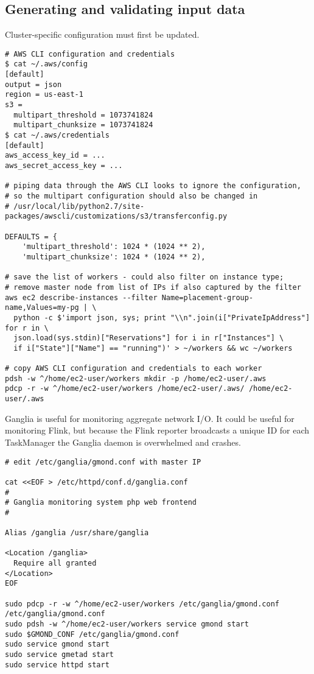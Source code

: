 \documentclass{article}
\begin{document}
\subsection{Generating and validating input data}

Cluster-specific configuration must first be updated.

\begin{adjustwidth}{-1.5in}{-1.5in}
\begin{verbatim}
# AWS CLI configuration and credentials
$ cat ~/.aws/config
[default]
output = json
region = us-east-1
s3 =
  multipart_threshold = 1073741824
  multipart_chunksize = 1073741824
$ cat ~/.aws/credentials 
[default]
aws_access_key_id = ...
aws_secret_access_key = ...

# piping data through the AWS CLI looks to ignore the configuration,
# so the multipart configuration should also be changed in
# /usr/local/lib/python2.7/site-packages/awscli/customizations/s3/transferconfig.py

DEFAULTS = {
    'multipart_threshold': 1024 * (1024 ** 2),
    'multipart_chunksize': 1024 * (1024 ** 2),

# save the list of workers - could also filter on instance type;
# remove master node from list of IPs if also captured by the filter
aws ec2 describe-instances --filter Name=placement-group-name,Values=my-pg | \
  python -c $'import json, sys; print "\\n".join(i["PrivateIpAddress"] for r in \
  json.load(sys.stdin)["Reservations"] for i in r["Instances"] \
  if i["State"]["Name"] == "running")' > ~/workers && wc ~/workers

# copy AWS CLI configuration and credentials to each worker
pdsh -w ^/home/ec2-user/workers mkdir -p /home/ec2-user/.aws
pdcp -r -w ^/home/ec2-user/workers /home/ec2-user/.aws/ /home/ec2-user/.aws
\end{verbatim}
\end{adjustwidth}

Ganglia is useful for monitoring aggregate network I/O. It could be useful for monitoring Flink, but because the Flink reporter broadcasts a unique ID for each TaskManager the Ganglia daemon is overwhelmed and crashes.

\begin{adjustwidth}{-1.5in}{-1.5in}
\begin{verbatim}
# edit /etc/ganglia/gmond.conf with master IP

cat <<EOF > /etc/httpd/conf.d/ganglia.conf
#
# Ganglia monitoring system php web frontend
#

Alias /ganglia /usr/share/ganglia

<Location /ganglia>
  Require all granted
</Location>
EOF

sudo pdcp -r -w ^/home/ec2-user/workers /etc/ganglia/gmond.conf /etc/ganglia/gmond.conf
sudo pdsh -w ^/home/ec2-user/workers service gmond start
sudo $GMOND_CONF /etc/ganglia/gmond.conf
sudo service gmond start
sudo service gmetad start
sudo service httpd start
\end{verbatim}
\end{adjustwidth}
\end{document}

